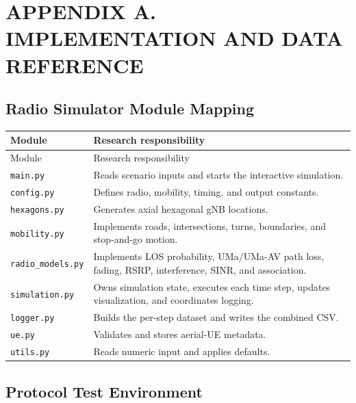 \section*{APPENDIX A. IMPLEMENTATION AND DATA REFERENCE}
\setcounter{section}{6}
\setcounter{subsection}{0}
\setcounter{figure}{0}
\setcounter{table}{0}

\subsection{Radio Simulator Module Mapping}

\begin{longtable}{p{3.2cm}p{10.7cm}}
\toprule
Module & Research responsibility\\
\midrule
\endfirsthead
\toprule
Module & Research responsibility\\
\midrule
\endhead
\texttt{main.py} & Reads scenario inputs and starts the interactive simulation.\\
\texttt{config.py} & Defines radio, mobility, timing, and output constants.\\
\texttt{hexagons.py} & Generates axial hexagonal gNB locations.\\
\texttt{mobility.py} & Implements roads, intersections, turns, boundaries, and stop-and-go motion.\\
\texttt{radio\_models.py} & Implements LOS probability, UMa/UMa-AV path loss, fading, RSRP, interference, SINR, and association.\\
\texttt{simulation.py} & Owns simulation state, executes each time step, updates visualization, and coordinates logging.\\
\texttt{logger.py} & Builds the per-step dataset and writes the combined CSV.\\
\texttt{ue.py} & Validates and stores aerial-UE metadata.\\
\texttt{utils.py} & Reads numeric input and applies defaults.\\
\bottomrule
\end{longtable}

\subsection{Protocol Test Environment}

